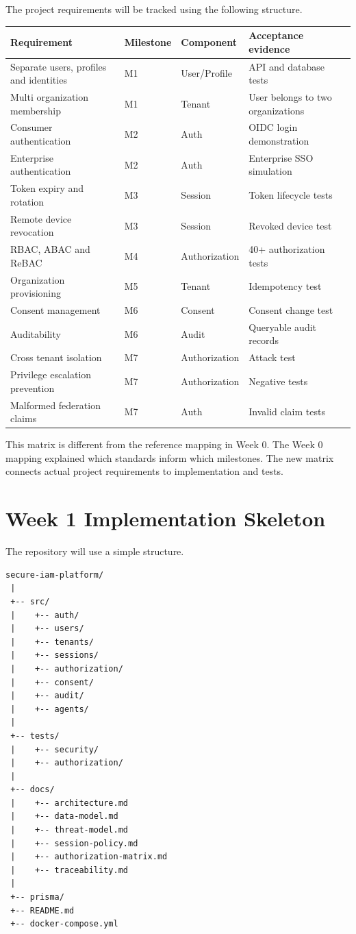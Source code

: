\documentclass[11pt,a4paper]{article}
\begin{document}
The project requirements will be tracked using the following structure.

\begin{longtable}{p{}p{}p{}p{}}
\toprule
Requirement & Milestone & Component & Acceptance evidence \\
\midrule
Separate users, profiles and identities & M1 & User/Profile & API and database tests \\
Multi organization membership & M1 & Tenant & User belongs to two organizations \\
Consumer authentication & M2 & Auth & OIDC login demonstration \\
Enterprise authentication & M2 & Auth & Enterprise SSO simulation \\
Token expiry and rotation & M3 & Session & Token lifecycle tests \\
Remote device revocation & M3 & Session & Revoked device test \\
RBAC, ABAC and ReBAC & M4 & Authorization & 40+ authorization tests \\
Organization provisioning & M5 & Tenant & Idempotency test \\
Consent management & M6 & Consent & Consent change test \\
Auditability & M6 & Audit & Queryable audit records \\
Cross tenant isolation & M7 & Authorization & Attack test \\
Privilege escalation prevention & M7 & Authorization & Negative tests \\
Malformed federation claims & M7 & Auth & Invalid claim tests \\
\bottomrule
\end{longtable}

This matrix is different from the reference mapping in Week 0. The Week 0 mapping explained which standards inform which milestones. The new matrix connects actual project requirements to implementation and tests.

\section{Week 1 Implementation Skeleton}

The repository will use a simple structure.

\begin{verbatim}
secure-iam-platform/
 |
 +-- src/
 |    +-- auth/
 |    +-- users/
 |    +-- tenants/
 |    +-- sessions/
 |    +-- authorization/
 |    +-- consent/
 |    +-- audit/
 |    +-- agents/
 |
 +-- tests/
 |    +-- security/
 |    +-- authorization/
 |
 +-- docs/
 |    +-- architecture.md
 |    +-- data-model.md
 |    +-- threat-model.md
 |    +-- session-policy.md
 |    +-- authorization-matrix.md
 |    +-- traceability.md
 |
 +-- prisma/
 +-- README.md
 +-- docker-compose.yml
\end{verbatim}
\end{document}
